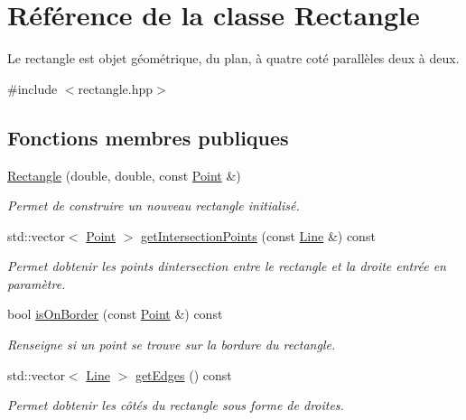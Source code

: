 \hypertarget{classRectangle}{}\section{Référence de la classe Rectangle}
\label{classRectangle}


Le rectangle est objet géométrique, du plan, à quatre coté parallèles deux à deux.  




{\ttfamily \#include $<$rectangle.\+hpp$>$}

\subsection*{Fonctions membres publiques}
\begin{DoxyCompactItemize}
\item 
\hyperlink{classRectangle_ad5508555707c9e4d7334292a08037079}{Rectangle} (double, double, const \hyperlink{classPoint}{Point} \&)
\begin{DoxyCompactList}\small\item\em Permet de construire un nouveau rectangle initialisé. \end{DoxyCompactList}\item 
std\+::vector$<$ \hyperlink{classPoint}{Point} $>$ \hyperlink{classRectangle_a062fb917aa2d811e17ed59caa43c662a}{get\+Intersection\+Points} (const \hyperlink{classLine}{Line} \&) const 
\begin{DoxyCompactList}\small\item\em Permet d\textquotesingle{}obtenir les points d\textquotesingle{}intersection entre le rectangle et la droite entrée en paramètre. \end{DoxyCompactList}\item 
bool \hyperlink{classRectangle_a74f9fcc2cd8e170fd13137b95903dcb5}{is\+On\+Border} (const \hyperlink{classPoint}{Point} \&) const 
\begin{DoxyCompactList}\small\item\em Renseigne si un point se trouve sur la bordure du rectangle. \end{DoxyCompactList}\item 
std\+::vector$<$ \hyperlink{classLine}{Line} $>$ \hyperlink{classRectangle_aaed6939da22aef8b1028b3310c4b0ff0}{get\+Edges} () const 
\begin{DoxyCompactList}\small\item\em Permet d\textquotesingle{}obtenir les côtés du rectangle sous forme de droites. \end{DoxyCompactList}\item 

\end{DoxyCompactItemize}
